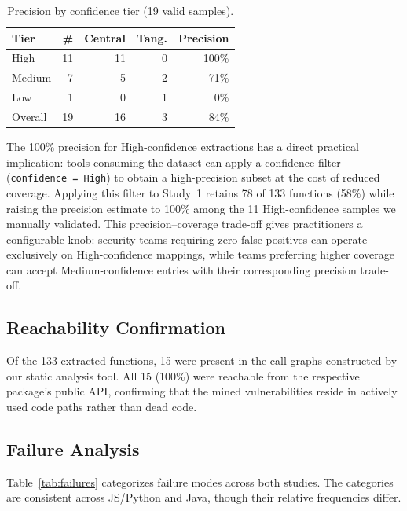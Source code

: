\documentclass[sigconf,nonacm]{acmart}
\begin{document}
\begin{table}[t]
    \centering
    \caption{Precision by confidence tier (19 valid samples).}
    \label{tab:precision-tier}
    \begin{tabular}{lrrrr}
        \toprule
        \textbf{Tier} & \textbf{\#} & \textbf{Central} & \textbf{Tang.} & \textbf{Precision} \\
        \midrule
        High   & 11 & 11 & 0 & 100\% \\
        Medium &  7 &  5 & 2 &  71\% \\
        Low    &  1 &  0 & 1 &   0\% \\
        \midrule
        Overall & 19 & 16 & 3 &  84\% \\
        \bottomrule
    \end{tabular}
\end{table}

The 100\% precision for High-confidence extractions has a direct practical
implication: tools consuming the dataset can apply a confidence filter
(\texttt{confidence = High}) to obtain a high-precision subset at the cost
of reduced coverage.
Applying this filter to Study~1 retains 78 of 133 functions (58\%) while
raising the precision estimate to 100\% among the 11 High-confidence samples
we manually validated.
This precision--coverage trade-off gives practitioners a configurable
knob: security teams requiring zero false positives can operate
exclusively on High-confidence mappings, while teams preferring higher
coverage can accept Medium-confidence entries with their corresponding
precision trade-off.

\subsection{Reachability Confirmation}

Of the 133 extracted functions, 15 were present in the call graphs 
constructed by our static analysis tool. All 15 (100\%) were reachable 
from the respective package's public API, confirming that the mined 
vulnerabilities reside in actively used code paths rather than dead code.

\subsection{Failure Analysis}

Table~\ref{tab:failures} categorizes failure modes across both studies.
The categories are consistent across JS/Python and Java, though their
relative frequencies differ.
\end{document}
